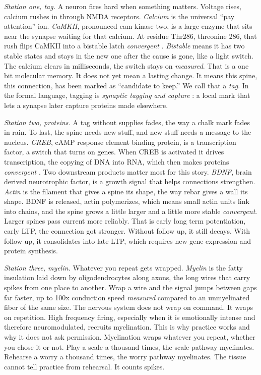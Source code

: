 \textit{Station one, tag.} A neuron fires hard when something matters. Voltage rises, calcium rushes in through NMDA receptors. \textit{Calcium} is the universal ``pay attention'' ion. \textit{CaMKII}, pronounced cam kinase two, is a large enzyme that sits near the synapse waiting for that calcium. At residue Thr286, threonine 286, that rush flips CaMKII into a bistable latch \textit{convergent} \citep{kandel2000}. \textit{Bistable} means it has two stable states and stays in the new one after the cause is gone, like a light switch. The calcium clears in milliseconds, the switch stays on \textit{measured}. That is a one bit molecular memory. It does not yet mean a lasting change. It means this spine, this connection, has been marked as ``candidate to keep.'' We call that a \textit{tag}. In the formal language, tagging is \textit{synaptic tagging and capture} \citep{kandel2000}: a local mark that lets a synapse later capture proteins made elsewhere.

\textit{Station two, proteins.} A tag without supplies fades, the way a chalk mark fades in rain. To last, the spine needs new stuff, and new stuff needs a message to the nucleus. \textit{CREB}, cAMP response element binding protein, is a transcription factor, a switch that turns on genes. When CREB is activated it drives transcription, the copying of DNA into RNA, which then makes proteins \textit{convergent} \citep{kandel2000}. Two downstream products matter most for this story. \textit{BDNF}, brain derived neurotrophic factor, is a growth signal that helps connections strengthen. \textit{Actin} is the filament that gives a spine its shape, the way rebar gives a wall its shape. BDNF is released, actin polymerizes, which means small actin units link into chains, and the spine grows a little larger and a little more stable \textit{convergent}. Larger spines pass current more reliably. That is early long term potentiation, early LTP, the connection got stronger. Without follow up, it still decays. With follow up, it consolidates into late LTP, which requires new gene expression and protein synthesis.

\textit{Station three, myelin.} Whatever you repeat gets wrapped. \textit{Myelin} is the fatty insulation laid down by oligodendrocytes along axons, the long wires that carry spikes from one place to another. Wrap a wire and the signal jumps between gaps far faster, up to 100x conduction speed \textit{measured} compared to an unmyelinated fiber of the same size. The nervous system does not wrap on command. It wraps on repetition. High frequency firing, especially when it is emotionally intense and therefore neuromodulated, recruits myelination. This is why practice works and why it does not ask permission. Myelination wraps whatever you repeat, whether you chose it or not. Play a scale a thousand times, the scale pathway myelinates. Rehearse a worry a thousand times, the worry pathway myelinates. The tissue cannot tell practice from rehearsal. It counts spikes.

